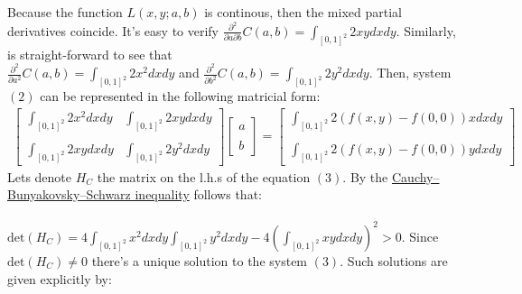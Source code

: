 \documentclass{exam}
\begin{document}
Because the function $L(x,y;a,b)$ is continous, then the mixed partial derivatives coincide. It's easy to verify $\frac{\partial^2}{\partial a \partial b} C(a,b) =  \displaystyle\int_{[0,1]^2} 2xy d x d y$. Similarly, is 
straight-forward to see that \\
$\frac{\partial^2}{\partial a^2} C(a,b) = \displaystyle\int_{[0,1]^2} 2x^2 d x d y$  and $\frac{\partial^2}{\partial b^2} C(a,b) =  \displaystyle\int_{[0,1]^2} 2y^2 d x d y$. Then, system $(2)$ can be represented in the 
following matricial form:
\begin{equation}
        \displaystyle\begin{aligned}
        \begin{bmatrix}
            \displaystyle\int_{[0,1]^2} 2x^2 d x d y & \displaystyle\int_{[0,1]^2} 2xy d x d y\\
            \\
            \displaystyle\int_{[0,1]^2} 2xy d x d y & \displaystyle\int_{[0,1]^2} 2y^2 d x d y
        \end{bmatrix} 
        \begin{bmatrix}
            a\\
            \\
            b
        \end{bmatrix} 
        =
        \begin{bmatrix}
            \displaystyle\int_{[0,1]^2} 2(f(x,y) - f(0,0)) x d x d y\\
            \\
            \displaystyle\int_{[0,1]^2} 2(f(x,y) - f(0,0)) y d x d y
        \end{bmatrix} 
    \end{aligned}
\end{equation} 
Lets denote $H_{C}$ the matrix on the l.h.s of the equation $(3)$. By the \href{https://en.wikipedia.org/wiki/Cauchy%E2%80%93Schwarz_inequality}{Cauchy–Bunyakovsky–Schwarz inequality} 
follows that:\\
\\
$\text{det}( H_{C}) = 4 \displaystyle\int_{[0,1]^2} x^2 d x d y \displaystyle\int_{[0,1]^2} y^2 d x d y  - 4 (\displaystyle\int_{[0,1]^2} xy d x d y )^2 > 0$. Since $\text{det}( H_{C}) \neq 0$ there's a unique solution to the system $(3)$. Such solutions are given explicitly by:\\
\end{document}
